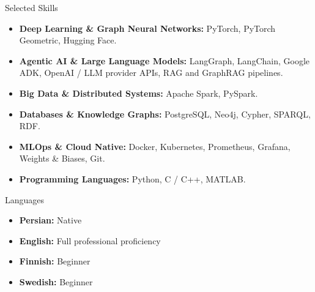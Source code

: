\documentclass{resume}
\begin{document}
\begin{rSection}{Selected Skills}
\vspace{+.1cm}

\begin{itemize}

    \item {\bf Deep Learning \& Graph Neural Networks:} PyTorch, PyTorch Geometric, Hugging Face.

    \item {\bf Agentic AI \& Large Language Models:} LangGraph, LangChain, Google ADK, OpenAI / LLM provider APIs, RAG and GraphRAG pipelines.

    \item {\bf Big Data \& Distributed Systems:} Apache Spark, PySpark.

    \item {\bf Databases \& Knowledge Graphs:} PostgreSQL, Neo4j, Cypher, SPARQL, RDF.

    \item {\bf MLOps \& Cloud Native:} Docker, Kubernetes, Prometheus, Grafana, Weights \& Biases, Git.

    \item {\bf Programming Languages:} Python, C / C++, MATLAB.

\end{itemize}

\end{rSection}


\begin{rSection}{Languages}
\vspace{+.1cm}

\begin{itemize}

    \item {\bf Persian:} Native

    \item {\bf English:} Full professional proficiency

    \item {\bf Finnish:} Beginner

    \item {\bf Swedish:} Beginner

\end{itemize}

\end{rSection}
\end{document}

